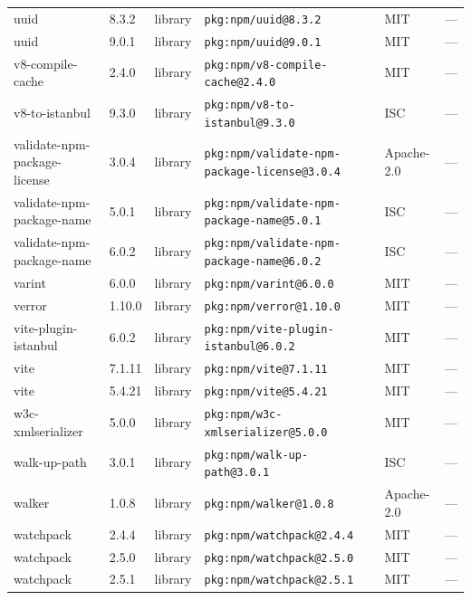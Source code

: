 \documentclass[11pt,a4paper]{article}
\begin{document}
\begin{longtable}{|p{4cm}|p{2cm}|p{1.6cm}|p{5cm}|p{1.5cm}|p{3.5cm}|}
\raggedright uuid & 8.3.2 & library & \small\texttt{pkg:npm/uuid@8.3.2} & MIT & \small — \\
\raggedright uuid & 9.0.1 & library & \small\texttt{pkg:npm/uuid@9.0.1} & MIT & \small — \\
\raggedright v8-compile-cache & 2.4.0 & library & \small\texttt{pkg:npm/v8-compile-cache@2.4.0} & MIT & \small — \\
\raggedright v8-to-istanbul & 9.3.0 & library & \small\texttt{pkg:npm/v8-to-istanbul@9.3.0} & ISC & \small — \\
\raggedright validate-npm-package-license & 3.0.4 & library & \small\texttt{pkg:npm/validate-npm-package-license@3.0.4} & Apache-2.0 & \small — \\
\raggedright validate-npm-package-name & 5.0.1 & library & \small\texttt{pkg:npm/validate-npm-package-name@5.0.1} & ISC & \small — \\
\raggedright validate-npm-package-name & 6.0.2 & library & \small\texttt{pkg:npm/validate-npm-package-name@6.0.2} & ISC & \small — \\
\raggedright varint & 6.0.0 & library & \small\texttt{pkg:npm/varint@6.0.0} & MIT & \small — \\
\raggedright verror & 1.10.0 & library & \small\texttt{pkg:npm/verror@1.10.0} & MIT & \small — \\
\raggedright vite-plugin-istanbul & 6.0.2 & library & \small\texttt{pkg:npm/vite-plugin-istanbul@6.0.2} & MIT & \small — \\
\raggedright vite & 7.1.11 & library & \small\texttt{pkg:npm/vite@7.1.11} & MIT & \small — \\
\raggedright vite & 5.4.21 & library & \small\texttt{pkg:npm/vite@5.4.21} & MIT & \small — \\
\raggedright w3c-xmlserializer & 5.0.0 & library & \small\texttt{pkg:npm/w3c-xmlserializer@5.0.0} & MIT & \small — \\
\raggedright walk-up-path & 3.0.1 & library & \small\texttt{pkg:npm/walk-up-path@3.0.1} & ISC & \small — \\
\raggedright walker & 1.0.8 & library & \small\texttt{pkg:npm/walker@1.0.8} & Apache-2.0 & \small — \\
\raggedright watchpack & 2.4.4 & library & \small\texttt{pkg:npm/watchpack@2.4.4} & MIT & \small — \\
\raggedright watchpack & 2.5.0 & library & \small\texttt{pkg:npm/watchpack@2.5.0} & MIT & \small — \\
\raggedright watchpack & 2.5.1 & library & \small\texttt{pkg:npm/watchpack@2.5.1} & MIT & \small — \\

\end{longtable}
\end{document}
